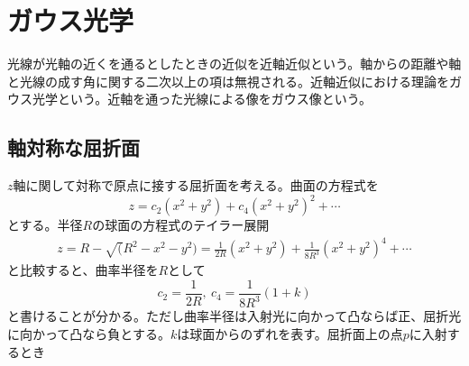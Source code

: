 \section{ガウス光学}

光線が光軸の近くを通るとしたときの近似を近軸近似という。軸からの距離や軸と光線の成す角に関する二次以上の項は無視される。近軸近似における理論をガウス光学という。近軸を通った光線による像をガウス像という。

\subsection{軸対称な屈折面}
	$z$軸に関して対称で原点に接する屈折面を考える。曲面の方程式を
		\[z = c_2(x^2 + y^2) + c_4(x^2 + y^2)^2 + \cdots\]
	とする。半径$R$の球面の方程式のテイラー展開
	\begin{align*}
		z = R - \sqrt(R^2 - x^2 - y^2) = \frac{1}{2R}(x^2 + y^2) + \frac{1}{8R^3}(x^2 + y^2)^4 + \cdots
	\end{align*}
	と比較すると、曲率半径を$R$として
		\[c_2 = \frac{1}{2R},\ c_4 = \frac{1}{8R^3}(1 + k)\]
	と書けることが分かる。ただし曲率半径は入射光に向かって凸ならば正、屈折光に向かって凸なら負とする。$k$は球面からのずれを表す。屈折面上の点$p$に入射するとき

